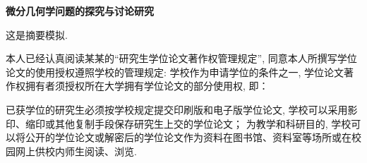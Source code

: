 \begin{center}
    {\fontsize{20}{20}\selectfont\bf 微分几何学问题的探究与讨论研究}
\end{center}
\vspace{.2cm}
\begin{cnabstract}
\vspace*{.2cm}
    这是摘要模拟. 
    
    本人已经认真阅读某某的“研究生学位论文著作权管理规定”, 同意本人所撰写学位论文的使用授权遵照学校的管理规定:  学校作为申请学位的条件之一, 学位论文著作权拥有者须授权所在大学拥有学位论文的部分使用权, 即：
    
    已获学位的研究生必须按学校规定提交印刷版和电子版学位论文, 学校可以采用影印、缩印或其他复制手段保存研究生上交的学位论文； 为教学和科研目的, 学校可以将公开的学位论文或解密后的学位论文作为资料在图书馆、资料室等场所或在校园网上供校内师生阅读、浏览. \\[.5em]
   
\end{cnabstract}














\clearpage